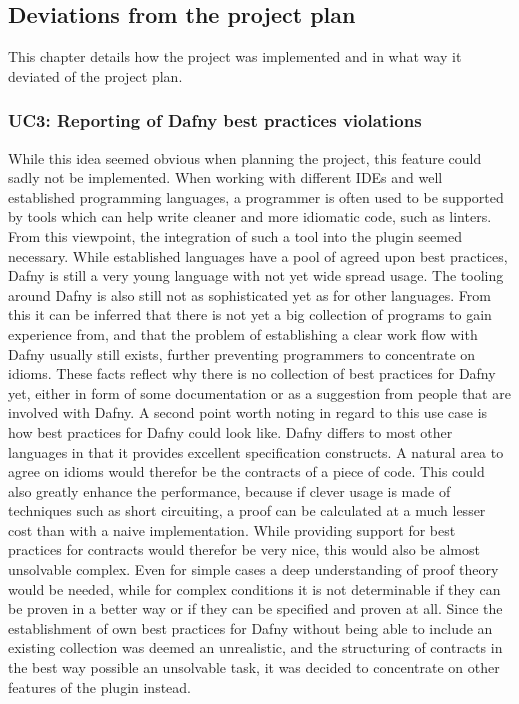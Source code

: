 \subsection{Deviations from the project plan}\label{projectCourse}
This chapter details how the project was implemented and in what way it deviated of the project plan.
\subsubsection{UC3: Reporting of Dafny best practices violations}
While this idea seemed obvious when planning the project, this feature could sadly not be implemented. When working with different IDEs and well established programming languages, a programmer is often used to be supported by tools which can help write cleaner and more idiomatic code, such as linters. From this viewpoint, the integration of such a tool into the plugin seemed necessary. \newline
While established languages have a pool of agreed upon best practices, Dafny is still a very young language with not yet wide spread usage. The tooling around Dafny is also still not as sophisticated yet as for other languages. From this it can be inferred that there is not yet a big collection of programs to gain experience from, and that the problem of establishing a clear work flow with Dafny usually still exists, further preventing programmers to concentrate on idioms. \newline
These facts reflect why there is no collection of best practices for Dafny yet, either in form of some documentation or as a suggestion from people that are involved with Dafny. \newline
A second point worth noting in regard to this use case is how best practices for Dafny could look like. Dafny differs to most other languages in that it provides excellent specification constructs. A natural area to agree on idioms would therefor be the contracts of a piece of code. This could also greatly enhance the performance, because if clever usage is made of techniques such as short circuiting, a proof can be calculated at a much lesser cost than with a naive implementation. \newline
While providing support for best practices for contracts would therefor be very nice, this would also be almost unsolvable complex. Even for simple cases a deep understanding of proof theory would be needed, while for complex conditions it is not determinable if they can be proven in a better way or if they can be specified and proven at all. \newline
Since the establishment of own best practices for Dafny without being able to include an existing collection was deemed an unrealistic, and the structuring of contracts in the best way possible an unsolvable task, it was decided to concentrate on other features of the plugin instead.
